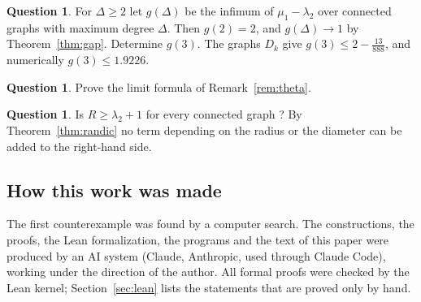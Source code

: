 \documentclass[11pt]{amsart}
\theoremstyle{definition}
\newtheorem{question}[theorem]{Question}
\theoremstyle{remark}
\begin{document}
\begin{question}
For $\Delta\ge2$ let $g(\Delta)$ be the infimum of $\mu_1-\lambda_2$ over connected graphs with
maximum degree $\Delta$. Then $g(2)=2$, and $g(\Delta)\to1$ by Theorem~\ref{thm:gap}. Determine
$g(3)$. The graphs $D_k$ give $g(3)\le2-\frac{13}{888}$, and numerically $g(3)\le1.9226$.
\end{question}

\begin{question}
Prove the limit formula of Remark~\ref{rem:theta}.
\end{question}

\begin{question}
Is $R\ge\lambda_2+1$ for every connected graph \cite[Conjecture~1]{Cazenave}? By
Theorem~\ref{thm:randic} no term depending on the radius or the diameter can be added to the
right-hand side.
\end{question}

\subsection*{How this work was made}
The first counterexample was found by a computer search. The constructions, the proofs, the
Lean formalization, the programs and the text of this paper were produced by an AI system
(Claude, Anthropic, used through Claude Code), working under the direction of the author. All
formal proofs were checked by the Lean kernel; Section~\ref{sec:lean} lists the statements that
are proved only by hand.
\end{document}
